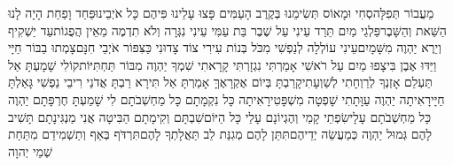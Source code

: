 \documentclass[../main/main.tex]{subfiles}
\begin{document}
\begin{multicols}{\ncols}
מֵעֲבוֹר תְּפִלָּה\PreVerseSpace{}סְחִי וּמָאוֹס תְּשִׂימֵנוּ בְּקֶרֶב הָעַמִּים \ClosedSection{}פָּצוּ עָלֵינוּ פִּיהֶם כָּל אֹיְבֵינוּ\PreVerseSpace{}פַּחַד וָפַחַת הָיָה לָנוּ הַשֵּׁאת וְהַשָּׁבֶר\PreVerseSpace{}פַּלְגֵי מַיִם תֵּרַד עֵינִי עַל שֶׁבֶר בַּת עַמִּי \ClosedSection{}עֵינִי נִגְּרָה וְלֹא תִדְמֶה מֵאֵין הֲפֻגוֹת\PreVerseSpace{}עַד יַשְׁקִיף וְיֵרֶא יַהְוֶה מִשָּׁמָיִם\PreVerseSpace{}עֵינִי עוֹלְלָה לְנַפְשִׁי מִכֹּל בְּנוֹת עִירִי \ClosedSection{}צוֹד צָדוּנִי כַּצִּפּוֹר אֹיְבַי חִנָּם\PreVerseSpace{}צָמְתוּ בַבּוֹר חַיָּי וַיַּדּוּ אֶבֶן בִּי\PreVerseSpace{}צָפוּ מַיִם עַל רֹאשִׁי אָמַרְתִּי נִגְזָרְתִּי \ClosedSection{}קָרָאתִי שִׁמְךָ יַהְוֶה מִבּוֹר תַּחְתִּיּוֹת\PreVerseSpace{}קוֹלִי שָׁמָעְתָּ אַל תַּעְלֵם אָזְנְךָ לְרַוְחָתִי לְשַׁוְעָתִי\PreVerseSpace{}קָרַבְתָּ בְּיוֹם אֶקְרָאֶךָּ אָמַרְתָּ אַל תִּירָא \ClosedSection{}רַבְתָּ אֲדֹנַי רִיבֵי נַפְשִׁי גָּאַלְתָּ חַיָּי\PreVerseSpace{}רָאִיתָה יַהְוֶה עַוָּתָתִי שָׁפְטָה מִשְׁפָּטִי\PreVerseSpace{}רָאִיתָה כָּל נִקְמָתָם כָּל מַחְשְׁבֹתָם לִי \ClosedSection{}שָׁמַעְתָּ חֶרְפָּתָם יַהְוֶה כָּל מַחְשְׁבֹתָם עָלָי\PreVerseSpace{}שִׂפְתֵי קָמַי וְהֶגְיוֹנָם עָלַי כָּל הַיּוֹם\PreVerseSpace{}שִׁבְתָּם וְקִימָתָם הַבִּיטָה אֲנִי מַנְגִּינָתָם \ClosedSection{}תָּשִׁיב לָהֶם גְּמוּל יַהְוֶה כְּמַעֲשֵׂה יְדֵיהֶם\PreVerseSpace{}תִּתֵּן לָהֶם מְגִנַּת לֵב תַּאֲלָתְךָ לָהֶם\PreVerseSpace{}תִּרְדֹּף בְּאַף וְתַשְׁמִידֵם מִתַּחַת שְׁמֵי יְהוָה\OpenSection{}\par

\end{multicols}
\end{document}
